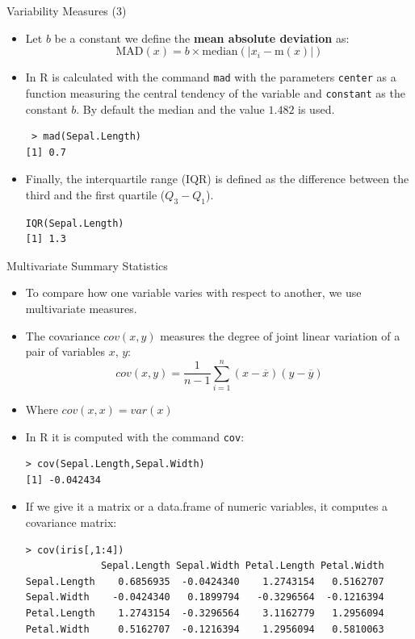 \documentclass[handout]{beamer}
\begin{document}
\begin{frame}[fragile]{Variability Measures (3)}
\scriptsize{ 
\begin{itemize}
 \item Let $b$ be a constant we define the \textbf{mean absolute deviation} as: 
 \begin{displaymath}
  \text{MAD}(x) = b \times \text{median}(|x_{i}-\text{m}(x)|)
 \end{displaymath}
 \item In R is calculated with the command \verb+mad+ with the parameters \verb+center+ as a function measuring the central tendency of the variable and \verb+constant+ as the constant $b$. By default the median and the value $1.482$ is used. 
 \begin{verbatim}
 > mad(Sepal.Length)
[1] 0.7 
 \end{verbatim}

 \item Finally, the interquartile range (IQR) is defined as the difference between the third and the first quartile ($Q_3 - Q_1$).
 \begin{verbatim}
IQR(Sepal.Length)
[1] 1.3  
 \end{verbatim}

\end{itemize}
  
} 
\end{frame}



\begin{frame}[fragile]{Multivariate Summary Statistics}
\scriptsize{
\begin{itemize}
 \item To compare how one variable varies with respect to another, we use multivariate measures.
 \item The covariance $cov(x,y)$ measures the degree of joint linear variation of a pair of variables $x$, $y$:
 \begin{displaymath}
  cov(x,y)=\frac{1}{n-1}\sum_{i=1}^{n}(x-\overline{x})(y-\overline{y})
 \end{displaymath}
 \item Where $cov(x,x)=var(x)$
\item In R it is computed with the command  \verb+cov+:
\begin{verbatim}
> cov(Sepal.Length,Sepal.Width)
[1] -0.042434 
\end{verbatim}
\item If we give it a matrix or a data.frame of numeric variables, it computes a covariance matrix:
\begin{verbatim}
> cov(iris[,1:4])
             Sepal.Length Sepal.Width Petal.Length Petal.Width
Sepal.Length    0.6856935  -0.0424340    1.2743154   0.5162707
Sepal.Width    -0.0424340   0.1899794   -0.3296564  -0.1216394
Petal.Length    1.2743154  -0.3296564    3.1162779   1.2956094
Petal.Width     0.5162707  -0.1216394    1.2956094   0.5810063 
\end{verbatim}

 
 
 
\end{itemize}



}
\end{frame}
\end{document}
